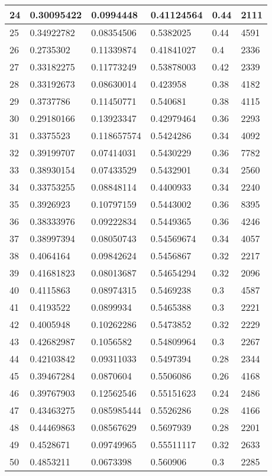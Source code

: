 \begin{longtable}{|l|l|l|l|l|l|}
24 & 0.30095422 & 0.0994448 & 0.41124564 & 0.44 & 2111 \\ \hline 
25 & 0.34922782 & 0.08354506 & 0.5382025 & 0.44 & 4591 \\ \hline 
26 & 0.2735302 & 0.11339874 & 0.41841027 & 0.4 & 2336 \\ \hline 
27 & 0.33182275 & 0.11773249 & 0.53878003 & 0.42 & 2339 \\ \hline 
28 & 0.33192673 & 0.08630014 & 0.423958 & 0.38 & 4182 \\ \hline 
29 & 0.3737786 & 0.11450771 & 0.540681 & 0.38 & 4115 \\ \hline 
30 & 0.29180166 & 0.13923347 & 0.42979464 & 0.36 & 2293 \\ \hline 
31 & 0.3375523 & 0.118657574 & 0.5424286 & 0.34 & 4092 \\ \hline 
32 & 0.39199707 & 0.07414031 & 0.5430229 & 0.36 & 7782 \\ \hline 
33 & 0.38930154 & 0.07433529 & 0.5432901 & 0.34 & 2560 \\ \hline 
34 & 0.33753255 & 0.08848114 & 0.4400933 & 0.34 & 2240 \\ \hline 
35 & 0.3926923 & 0.10797159 & 0.5443002 & 0.36 & 8395 \\ \hline 
36 & 0.38333976 & 0.09222834 & 0.5449365 & 0.36 & 4246 \\ \hline 
37 & 0.38997394 & 0.08050743 & 0.54569674 & 0.34 & 4057 \\ \hline 
38 & 0.4064164 & 0.09842624 & 0.5456867 & 0.32 & 2217 \\ \hline 
39 & 0.41681823 & 0.08013687 & 0.54654294 & 0.32 & 2096 \\ \hline 
40 & 0.4115863 & 0.08974315 & 0.5469238 & 0.3 & 4587 \\ \hline 
41 & 0.4193522 & 0.0899934 & 0.5465388 & 0.3 & 2221 \\ \hline 
42 & 0.4005948 & 0.10262286 & 0.5473852 & 0.32 & 2229 \\ \hline 
43 & 0.42682987 & 0.1056582 & 0.54809964 & 0.3 & 2267 \\ \hline 
44 & 0.42103842 & 0.09311033 & 0.5497394 & 0.28 & 2344 \\ \hline 
45 & 0.39467284 & 0.0870604 & 0.5506086 & 0.26 & 4168 \\ \hline 
46 & 0.39767903 & 0.12562546 & 0.55151623 & 0.24 & 2486 \\ \hline 
47 & 0.43463275 & 0.085985444 & 0.5526286 & 0.28 & 4166 \\ \hline 
48 & 0.44469863 & 0.08567629 & 0.5697939 & 0.28 & 2201 \\ \hline 
49 & 0.4528671 & 0.09749965 & 0.55511117 & 0.32 & 2633 \\ \hline 
50 & 0.4853211 & 0.0673398 & 0.560906 & 0.3 & 2285 \\ \hline 
\end{longtable}